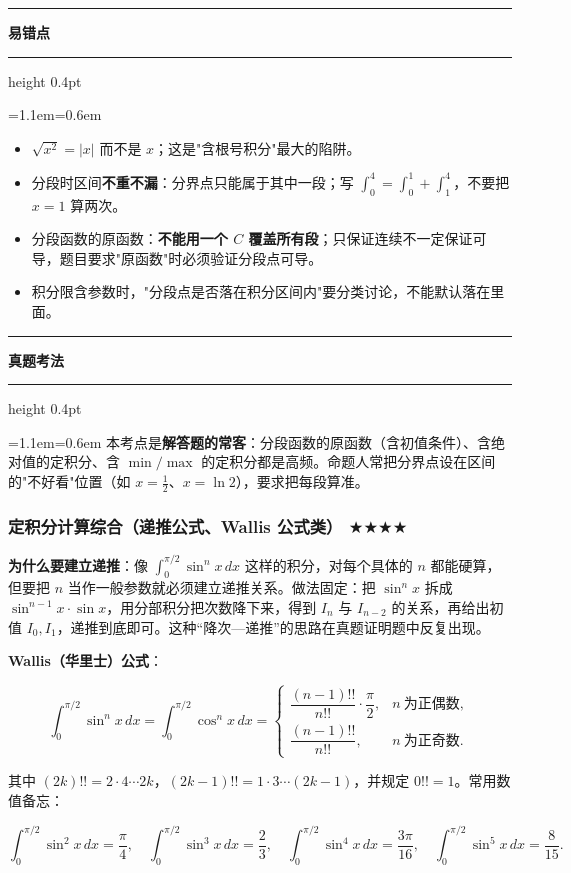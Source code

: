 \documentclass[11pt,openany,UTF8]{ctexbook}
\newcommand{\callouthead}[2]{%
  \par\addvspace{7pt}\noindent
  {\color{#1}\rule[-0.15em]{3pt}{1.05em}}\hspace{0.5em}%
  {\bfseries\color{#1}#2}\par\nobreak\vspace{-0.35em}%
  {\color{rulesep}\hrule height 0.4pt}\nobreak\vspace{0.45em}%
  \begingroup\small\setlength{\parindent}{0pt}%
  \leftskip=1.1em\rightskip=0.6em\noindent\ignorespaces}
\newcommand{\calloutend}{\par\endgroup\addvspace{7pt}}
\newenvironment{callwarn}[1]{\callouthead{warnbar}{#1}}{\calloutend}
\newenvironment{callexam}[1]{\callouthead{exambar}{#1}}{\calloutend}
\begin{document}
\begin{callwarn}{易错点}
\begin{itemize}
\item $\sqrt{x^2}=\lvert x\rvert$ 而不是 $x$；这是"含根号积分"最大的陷阱。
\item 分段时区间\textbf{不重不漏}：分界点只能属于其中一段；写 $\int_0^4=\int_0^1+\int_1^4$，不要把 $x=1$ 算两次。
\item 分段函数的原函数：\textbf{不能用一个 $C$ 覆盖所有段}；只保证连续不一定保证可导，题目要求"原函数"时必须验证分段点可导。
\item 积分限含参数时，"分段点是否落在积分区间内"要分类讨论，不能默认落在里面。
\end{itemize}
\end{callwarn}

\begin{callexam}{真题考法}
本考点是\textbf{解答题的常客}：分段函数的原函数（含初值条件）、含绝对值的定积分、含 $\min/\max$ 的定积分都是高频。命题人常把分界点设在区间的"不好看"位置（如 $x=\frac{1}{2}$、$x=\ln 2$），要求把每段算准。

\end{callexam}

\subsubsection{定积分计算综合（递推公式、Wallis 公式类） $\bigstar$$\bigstar$$\bigstar$$\bigstar$}

\textbf{为什么要建立递推}：像 $\int_0^{\pi/2}\sin^nx\,dx$ 这样的积分，对每个具体的 $n$ 都能硬算，但要把 $n$ 当作一般参数就必须建立递推关系。做法固定：把 $\sin^nx$ 拆成 $\sin^{n-1}x\cdot\sin x$，用分部积分把次数降下来，得到 $I_n$ 与 $I_{n-2}$ 的关系，再给出初值 $I_0,I_1$，递推到底即可。这种“降次—递推”的思路在真题证明题中反复出现。

\textbf{Wallis（华里士）公式}：

\[\int_0^{\pi/2}\sin^nx\,dx=\int_0^{\pi/2}\cos^nx\,dx=\begin{cases}\dfrac{(n-1)!!}{n!!}\cdot\dfrac{\pi}{2}, & n\ \text{为正偶数},\\[3mm]\dfrac{(n-1)!!}{n!!}, & n\ \text{为正奇数}.\end{cases}\]

其中 $(2k)!!=2\cdot4\cdots2k$，$(2k-1)!!=1\cdot3\cdots(2k-1)$，并规定 $0!!=1$。常用数值备忘：

\[\int_0^{\pi/2}\sin^2x\,dx=\frac{\pi}{4},\quad \int_0^{\pi/2}\sin^3x\,dx=\frac{2}{3},\quad \int_0^{\pi/2}\sin^4x\,dx=\frac{3\pi}{16},\quad \int_0^{\pi/2}\sin^5x\,dx=\frac{8}{15}.\]
\end{document}
